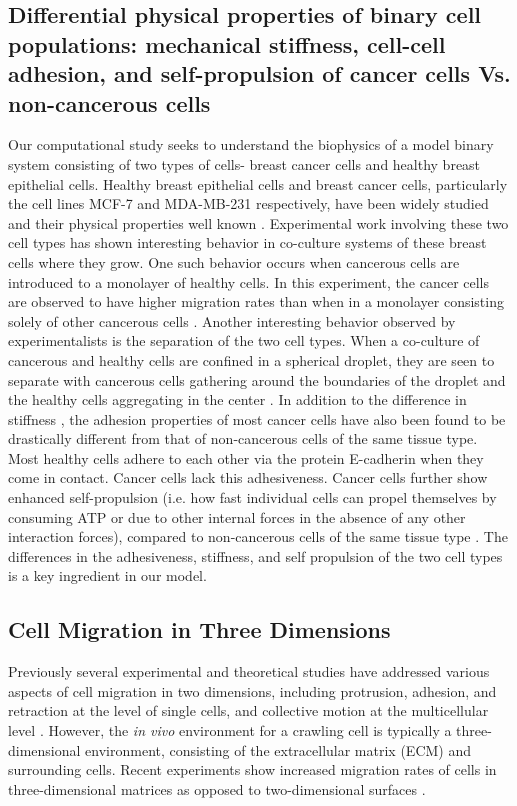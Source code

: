 \documentclass[aps,prb,twocolumn,groupedaddress,nofootinbib,floatfix]{revtex4}
\begin{document}
\subsection{Differential physical properties of binary cell populations: mechanical stiffness, cell-cell adhesion, and self-propulsion of cancer cells Vs. non-cancerous cells}

Our computational study seeks to understand the biophysics of a model binary system consisting of two types of cells- breast cancer cells and healthy breast epithelial cells. 
Healthy breast epithelial cells and breast cancer cells, particularly the cell lines MCF-7 and MDA-MB-231 respectively, have been widely studied and their physical properties well known \cite{Suresh}.
Experimental work involving these two cell types has shown interesting behavior in co-culture systems of these breast cells where they grow.
One such behavior occurs when cancerous cells are introduced to a monolayer of healthy cells.
In this experiment, the cancer cells are observed to have higher migration rates than when in a monolayer consisting solely of other cancerous cells \cite{Lee}.
Another interesting behavior observed by experimentalists is the separation of the two cell types.
When a co-culture of cancerous and healthy cells are confined in a spherical droplet, they are seen to separate with cancerous cells gathering around the boundaries of the droplet and the healthy cells aggregating in the center \cite{Mingming}. In addition to the difference in stiffness \cite{Lee}, the adhesion properties of most cancer cells have also been found to be drastically different from that of non-cancerous cells of the same tissue type\cite{Jeanes}.
Most healthy cells adhere to each other via the protein E-cadherin when they come in contact. Cancer cells lack this adhesiveness. Cancer cells further show enhanced self-propulsion (i.e. how fast individual cells can propel themselves by consuming ATP or due to other internal forces in the absence of any other interaction forces), compared to non-cancerous cells of the same tissue type \cite{Suresh}. The differences in the adhesiveness, stiffness, and self propulsion of the two cell types is a key ingredient in our model.


\subsection{Cell Migration in Three Dimensions}

Previously several experimental and theoretical studies have addressed various aspects of cell migration in two dimensions, including protrusion, adhesion, and retraction at the level of single cells, and collective motion at the multicellular level \cite{}.
However, the {\it in vivo} environment for a crawling cell is typically a three-dimensional environment, consisting of the extracellular matrix (ECM) and surrounding cells.
Recent experiments show increased migration rates of cells in three-dimensional matrices as opposed to two-dimensional surfaces \cite{Cukierman}.
\end{document}
